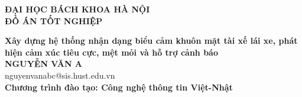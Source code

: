 \documentclass[DoAn.tex]{subfiles}
\begin{document}
\begin{titlepage}
\thispagestyle{empty}
\begin{center}

{\textbf{\large{ĐẠI HỌC BÁCH KHOA HÀ NỘI}}}\\[4cm]

{\textbf{\huge{ ĐỒ ÁN TỐT NGHIỆP}}}\\[1cm]
{\textbf{\Large{Xây dựng hệ thống nhận dạng biểu cảm khuôn mặt tài xế lái xe, phát hiện cảm xúc tiêu cực, mệt mỏi và hỗ trợ cảnh báo}}\\[1cm]

{\textbf{\large{NGUYỄN VĂN A}}}\\
{\large{nguyenvanabc@sis.hust.edu.vn}}\\[0.5cm]

{\textbf{\large{Chương trình đào tạo: Công nghệ thông tin Việt-Nhật
}}}\\

\vspace{4cm}
\begin{table}[H]
\centering
{}
\end{table}}
\end{center}



\end{titlepage}
\end{document}
